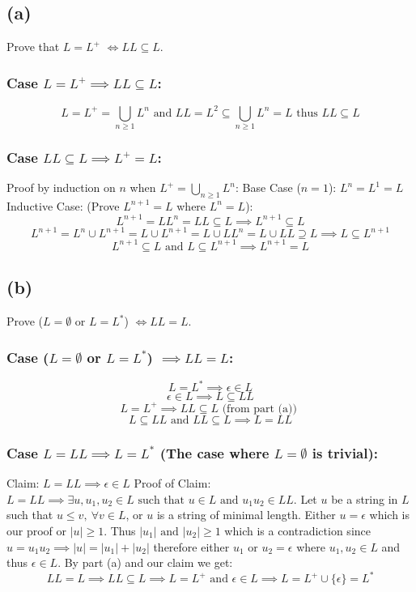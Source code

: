 \documentclass[12pt]{article}
\begin{document}
\subsection*{(a)} Prove that $L=L^+$ $\iff LL \subseteq L$.
\subsubsection*{Case $L=L^+ \implies LL \subseteq L$:}
$$L = L^+ = \bigcup\limits_{n\ge1} L^n \text{ and }
LL = L^2 \subseteq \bigcup\limits_{n\ge1} L^n = L \text{ thus }
LL \subseteq L$$

\subsubsection*{Case $LL \subseteq L \implies L^+ = L$:}
Proof by induction on $n$ when $L^+ = \bigcup\limits_{n\ge1} L^n$:
\newline
Base Case ($n = 1$): $L^n = L^1  = L$
\newline
Inductive Case: (Prove $L^{n+1} =L$ where $L^n = L$):
$$L^{n+1} = LL^{n} = LL \subseteq L \implies L^{n+1} \subseteq L$$
$$L^{n+1} = L^{n} \cup L^{n+1}= L \cup L^{n+1} = L \cup LL^n = L \cup LL
\supseteq L \implies L \subseteq L^{n+1}$$
$$L^{n+1} \subseteq L \text{ and } L \subseteq L^{n+1} \implies L^{n+1}=L$$

\subsection*{(b)}
Prove ($L=\emptyset$ or $L=L^*$) $\iff LL=L$.
\subsubsection*{Case ($L=\emptyset$ or $L=L^*$) $\implies LL=L$:}
$$L = L^\ast \implies {\epsilon } \in L$$
$${\epsilon } \in L \implies L \subseteq LL$$
$$L=L^+ \implies LL \subseteq L \text{ (from part (a)) } $$
$$L \subseteq LL \text{ and } LL \subseteq L
\implies L = LL$$

\subsubsection*{Case $L=LL \implies L = L^\ast$
(The case where $L= \emptyset$ is trivial):}
Claim: $L=LL \implies {\epsilon } \in L$
\newline
Proof of Claim: $L = LL \implies \exists u, u_1, u_2 \in L \text{ such that }
u \in L \text{ and } u_1u_2 \in LL$. Let $u$ be a string in $L$ such that
$u \leq v ,\: \forall v\in L$, or $u$ is a string of minimal length. Either
$u = \epsilon$ which is our proof or $|u| \ge 1$. Thus $|u_1| \text{ and }
|u_2| \ge 1$ which is a contradiction since $u = u_1u_2 \implies
|u| = |u_1| + |u_2|$ therefore either $u_1 \text{ or } u_2 = \epsilon$ where
$u_1, u_2 \in L$ and thus $\epsilon \in L$.
\vspace{0.5cm}
\newline
By part (a) and our claim we get:
$$LL=L \implies LL \subseteq L \implies
L = L^+ \text{ and } \epsilon \in L \implies
L = L^+ \cup \{\epsilon\} = L^\ast$$
\end{document}
